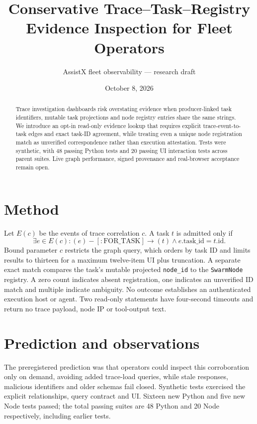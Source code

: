 \documentclass[11pt]{article}
\title{Conservative Trace--Task--Registry Evidence Inspection for Fleet Operators}
\author{AssistX fleet observability --- research draft}
\date{October 8, 2026}
\begin{document}
\maketitle
\begin{abstract}
Trace investigation dashboards risk overstating evidence when producer-linked task identifiers, mutable task projections and node registry entries share the same strings. We introduce an opt-in read-only evidence lookup that requires explicit trace-event-to-task edges and exact task-ID agreement, while treating even a unique node registration match as unverified correspondence rather than execution attestation. Tests were synthetic, with 48 passing Python tests and 20 passing UI interaction tests across parent suites. Live graph performance, signed provenance and real-browser acceptance remain open.
\end{abstract}
\section{Method}
Let $E(c)$ be the events of trace correlation $c$. A task $t$ is admitted only if
\[
\exists e\in E(c): (e)-[:\mathrm{FOR\_TASK}]\rightarrow(t)
\land e.\mathrm{task\_id}=t.\mathrm{id}.
\]
Bound parameter $c$ restricts the graph query, which orders by task ID and limits results to thirteen for a maximum twelve-item UI plus truncation. A separate exact match compares the task's mutable projected \texttt{node\_id} to the \texttt{SwarmNode} registry. A zero count indicates absent registration, one indicates an unverified ID match and multiple indicate ambiguity. No outcome establishes an authenticated execution host or agent. Two read-only statements have four-second timeouts and return no trace payload, node IP or tool-output text.
\section{Prediction and observations}
The preregistered prediction was that operators could inspect this corroboration only on demand, avoiding added trace-load queries, while stale responses, malicious identifiers and older schemas fail closed. Synthetic tests exercised the explicit relationships, query contract and UI. Sixteen new Python and five new Node tests passed; the total passing suites are 48 Python and 20 Node respectively, including earlier tests.
\end{document}

